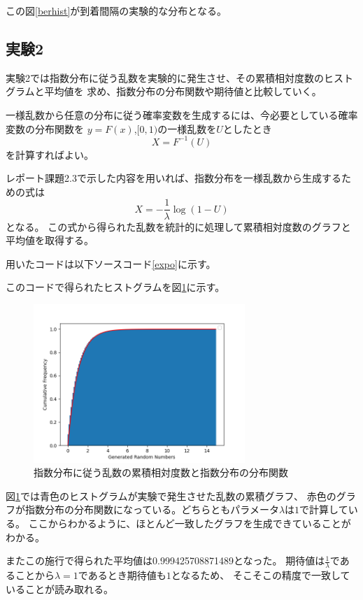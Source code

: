 \documentclass[a4paper,11pt,dvipdfmx]{jsarticle}
\begin{document}
この図\ref{berhist}が到着間隔の実験的な分布となる。

\subsection{実験2}
実験2では指数分布に従う乱数を実験的に発生させ、その累積相対度数のヒストグラムと平均値を
求め、指数分布の分布関数や期待値と比較していく。

一様乱数から任意の分布に従う確率変数を生成するには、今必要としている確率変数の分布関数を
$y=F(x)$,$[0,1)$の一様乱数を$U$としたとき
\begin{equation}
    X=F^{-1}(U)
\end{equation}
を計算すればよい。

レポート課題2.3で示した内容を用いれば、指数分布を一様乱数から生成するための式は
\begin{equation}
    X = -\frac{1}{\lambda}\log(1-U)
\end{equation}
となる。
この式から得られた乱数を統計的に処理して累積相対度数のグラフと平均値を取得する。

用いたコードは以下ソースコード\ref{expo}に示す。


このコードで得られたヒストグラムを図\ref{expohist}に示す。
\begin{figure}[h]
\centering
\includegraphics[width=80mm]{Exporand.png}
\caption{指数分布に従う乱数の累積相対度数と指数分布の分布関数}
\label{expohist}
\end{figure}

図\ref{expohist}では青色のヒストグラムが実験で発生させた乱数の累積グラフ、
赤色のグラフが指数分布の分布関数になっている。どちらともパラメータ$\lambda$は$1$で計算している。
ここからわかるように、ほとんど一致したグラフを生成できていることがわかる。

またこの施行で得られた平均値は0.999425708871489となった。
期待値は$\frac{1}{\lambda}$であることから$\lambda=1$であるとき期待値も$1$となるため、
そこそこの精度で一致していることが読み取れる。
\end{document}
